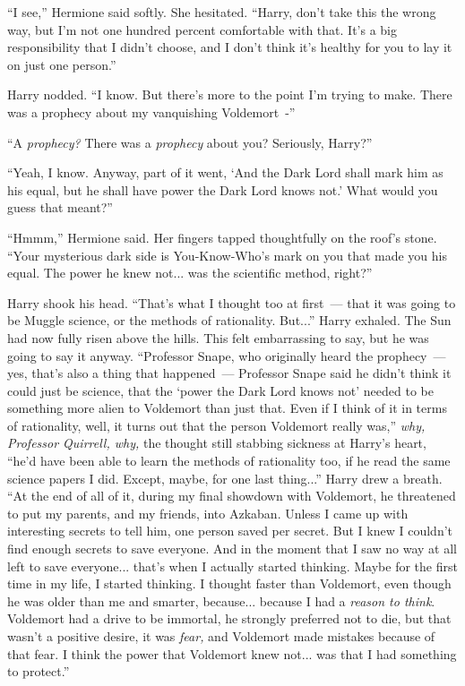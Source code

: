 ``I see,'' Hermione said softly. She hesitated. ``Harry, don't take this the wrong way, but I'm not one hundred percent comfortable with that. It's a big responsibility that I didn't choose, and I don't think it's healthy for you to lay it on just one person.''

Harry nodded. ``I know. But there's more to the point I'm trying to make. There was a prophecy about my vanquishing Voldemort~-''

``A \emph{prophecy?} There was a \emph{prophecy} about you? Seriously, Harry?''

``Yeah, I know. Anyway, part of it went, `And the Dark Lord shall mark him as his equal, but he shall have power the Dark Lord knows not.' What would you guess that meant?''

``Hmmm,'' Hermione said. Her fingers tapped thoughtfully on the roof's stone. ``Your mysterious dark side is You-Know-Who's mark on you that made you his equal. The power he knew not... was the scientific method, right?''

Harry shook his head. ``That's what I thought too at first~--- that it was going to be Muggle science, or the methods of rationality. But...'' Harry exhaled. The Sun had now fully risen above the hills. This felt embarrassing to say, but he was going to say it anyway. ``Professor Snape, who originally heard the prophecy~--- yes, that's also a thing that happened~--- Professor Snape said he didn't think it could just be science, that the `power the Dark Lord knows not' needed to be something more alien to Voldemort than just that. Even if I think of it in terms of rationality, well, it turns out that the person Voldemort really was,'' \emph{why, Professor Quirrell, why,} the thought still stabbing sickness at Harry's heart, ``he'd have been able to learn the methods of rationality too, if he read the same science papers I did. Except, maybe, for one last thing...'' Harry drew a breath. ``At the end of all of it, during my final showdown with Voldemort, he threatened to put my parents, and my friends, into Azkaban. Unless I came up with interesting secrets to tell him, one person saved per secret. But I knew I couldn't find enough secrets to save everyone. And in the moment that I saw no way at all left to save everyone... that's when I actually started thinking. Maybe for the first time in my life, I started thinking. I thought faster than Voldemort, even though he was older than me and smarter, because... because I had a \emph{reason to think}. Voldemort had a drive to be immortal, he strongly preferred not to die, but that wasn't a positive desire, it was \emph{fear,} and Voldemort made mistakes because of that fear. I think the power that Voldemort knew not... was that I had something to protect.''

